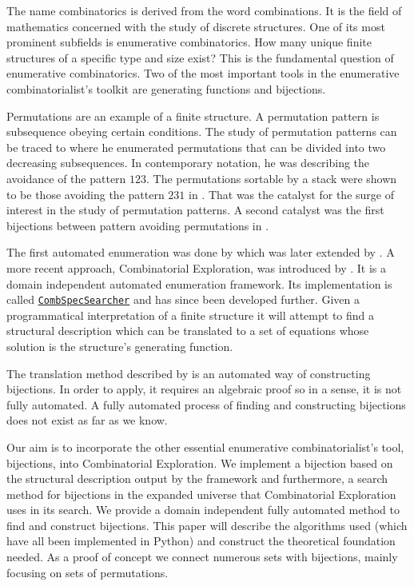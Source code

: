 \label{ch:introduction}
The name combinatorics is derived from the word combinations. It is the field of mathematics concerned with the study of discrete structures. One of its most prominent subfields is enumerative combinatorics. How many unique finite structures of a specific type and size exist? This is the fundamental question of enumerative combinatorics. Two of the most important tools in the enumerative combinatorialist's toolkit are generating functions and bijections.

Permutations are an example of a finite structure. A permutation pattern is subsequence obeying certain conditions. The study of permutation patterns can be traced to  where he enumerated permutations that can be divided into two decreasing subsequences. In contemporary notation, he was describing the avoidance of the pattern $123$. The permutations sortable by a stack were shown to be those avoiding the pattern $231$ in . That was the catalyst for the surge of interest in the study of permutation patterns. A second catalyst was the first bijections between pattern avoiding permutations in . 

The first automated enumeration was done by  which was later extended by . A more recent approach, Combinatorial Exploration, was introduced by . It is a domain independent automated enumeration framework. Its implementation is called \href{https://github.com/PermutaTriangle/comb_spec_searcher}{\texttt{CombSpecSearcher}} and has since been developed further. Given a programmatical interpretation of a finite structure it will attempt to find a structural description which can be translated to a set of equations whose solution is the structure's generating function.

The translation method described by  is an automated way of constructing bijections. In order to apply, it requires an algebraic proof so in a sense, it is not fully automated. A fully automated process of finding and constructing bijections does not exist as far as we know.

Our aim is to incorporate the other essential enumerative combinatorialist's tool, bijections, into Combinatorial Exploration. We implement a bijection based on the structural description output by the framework and furthermore, a search method for bijections in the expanded universe that Combinatorial Exploration uses in its search. We provide a domain independent fully automated method to find and construct bijections. This paper will describe the algorithms used (which have all been implemented in Python) and construct the theoretical foundation needed. As a proof of concept we connect numerous sets with bijections, mainly focusing on sets of permutations.

